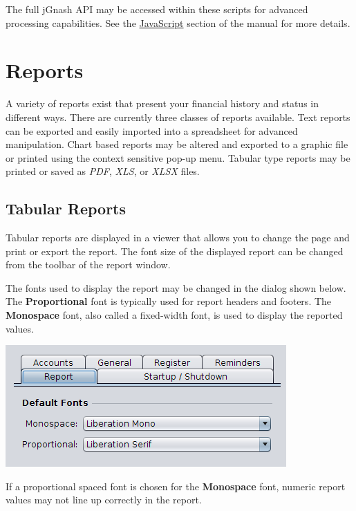 \documentclass[letterpaper,12pt]{book}
\begin{document}
    The full jGnash API may be accessed within these scripts for advanced processing capabilities.
    See the \hyperref[sec:javascript]{JavaScript} section of the manual for more details.


    \chapter{Reports}
    A variety of reports exist that present your financial history and status in different ways.
    There are currently three classes of reports available.
    Text reports can be exported and easily imported into a spreadsheet for advanced manipulation.
    Chart based reports may be altered and exported to a graphic file or printed using the context sensitive pop-up menu.
    Tabular type reports may be printed or saved as \textit{PDF}, \textit{XLS}, or \textit{XLSX} files.

    \section{Tabular Reports}
    Tabular reports are displayed in a viewer that allows you to change the page and print or export the report.
    The font size of the displayed report can be changed from the toolbar of the report window.

    The fonts used to display the report may be changed in the 
    dialog shown below. The \textbf{Proportional} font is typically used for report headers and footers.
    The \textbf{ Monospace} font, also called a fixed-width font, is used to display the reported values.

    \includegraphics[width=0.6\linewidth]{images/font-options.png}

    If a proportional spaced font is chosen for the \textbf{ Monospace} font, numeric report values may not line up
    correctly in the report.

\end{document}
